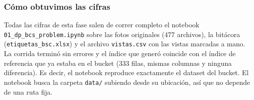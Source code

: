 \subsubsection*{Cómo obtuvimos las cifras}

Todas las cifras de esta fase salen de correr completo el notebook \nolinkurl{01_dp_bcs_problem.ipynb} sobre las fotos originales (477 archivos), la bitácora (\nolinkurl{etiquetas_bsc.xlsx}) y el archivo \nolinkurl{vistas.csv} con las vistas marcadas a mano. La corrida terminó sin errores y el índice que generó coincide con el índice de referencia que ya estaba en el bucket (333 filas, mismas columnas y ninguna diferencia). Es decir, el notebook reproduce exactamente el dataset del bucket. El notebook busca la carpeta \nolinkurl{data/} subiendo desde su ubicación, así que no depende de una ruta fija.
